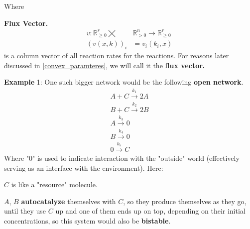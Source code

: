 Where
\begin{definition}\label{flux_vector}
	\textbf{Flux Vector.}
	\begin{align}
		v : \mathbb{R}^r_{\geq 0}  \bigtimes &\mathbb{R}^n_{> 0} \rightarrow \mathbb{R}^r_{\geq 0}  \nonumber \\
		(v(x,k))_{i} &= v_i(k_i, x)
	\end{align}
	is a column vector of all reaction rates for the reactions. For reasons later discussed in \ref{convex_paramteres}, we will call it the \textbf{flux vector.}
\end{definition}

\textbf{Example}\label{bigger_network_example1} 1:
One such bigger network would be the following \textbf{open network}.
\begin{align*}
	A + C \xrightarrow{k_{1}} 2A \\
	B + C \xrightarrow{k_{2}} 2B  \\
	A \xrightarrow{k_{3}} 0 \\
	B \xrightarrow{k_{4}} 0 \\
	0 \xrightarrow{k_{5}} C
\end{align*}
Where "$0$" is used to indicate interaction with the "outside" world (effectively serving as an interface with the environment).
Here: 	

$C$ is like a "resource" molecule.

$A$, $B$ \textbf{autocatalyze} themselves with $C$, so they produce themselves as they go, until they use $C$ up and one of them ends up on top, depending on their initial concentrations, so this system would also be \textbf{bistable}.


